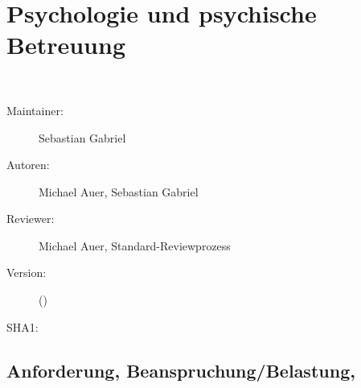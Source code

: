 \def\ChapterCode{PSI}
\chapter
[\CO{[PSI]} Psychologie und psychische Betreuung]
{Psychologie und psychische Betreuung}
\label{chp:PSY}

\ChapterIntro
{%
~~~
}
{%
\begin{description}
  \item[Maintainer:] Sebastian Gabriel
  \item[Autoren:] Michael Auer, Sebastian Gabriel
  \item[Reviewer:] Michael Auer, Standard-Reviewprozess
  \item[Version:] {\VarDocVersionTypeName} ({\VarDocVersionTypeDescription})
  \item[SHA1:] {\DocGitCommit}
\end{description}

{\TxTeilkapitelAASS}
}



\clearpage
\section{Anforderung, Beanspruchung/Belastung, 
}

\subsection{} 

